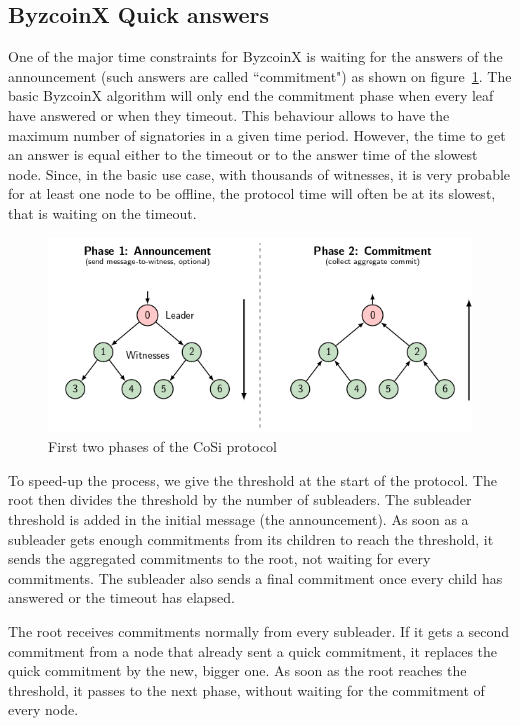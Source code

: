 \documentclass[11pt, a4paper, twoside, openright]{article}
\begin{document}
\subsection{ByzcoinX Quick answers}
One of the major time constraints for ByzcoinX is waiting for the answers of the announcement (such answers are called ``commitment") as shown on figure~\ref{fig:CoSi}. The basic ByzcoinX algorithm will only end the commitment phase when every leaf have answered or when they timeout. This behaviour allows to have the maximum number of signatories in a given time period. However, the time to get an answer is equal either to the timeout or to the answer time of the slowest node. Since, in the basic use case, with thousands of witnesses, it is very probable for at least one node to be offline, the protocol time will often be at its slowest, that is waiting on the timeout.
\begin{figure}
 \centering
  \includegraphics[width=\textwidth]{CoSi_Announcement_Commitment.png}
  \caption{First two phases of the CoSi protocol}
  \label{fig:CoSi}
\end{figure}

To speed-up the process, we give the threshold at the start of the protocol. The root then divides the threshold by the number of subleaders. The subleader threshold is added in the initial message (the announcement). As soon as a subleader gets enough commitments from its children to reach the threshold, it sends the aggregated commitments to the root, not waiting for every commitments. The subleader also sends a final commitment once every child has answered or the timeout has elapsed.

The root receives commitments normally from every subleader. If it gets a second commitment from a node that already sent a quick commitment, it replaces the quick commitment by the new, bigger one. As soon as the root reaches the threshold, it passes to the next phase, without waiting for the commitment of every node.
\end{document}
